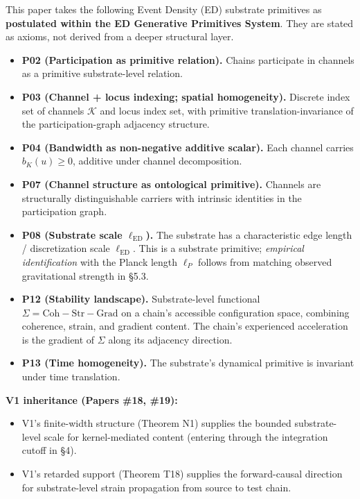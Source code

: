 \documentclass[11pt,a4paper]{article}
\begin{document}
This paper takes the following Event Density (ED) substrate primitives as \textbf{postulated within the ED Generative Primitives System}. They are stated as axioms, not derived from a deeper structural layer.

\begin{itemize}[noitemsep]
\item \textbf{P02 (Participation as primitive relation).} Chains participate in channels as a primitive substrate-level relation.
\item \textbf{P03 (Channel + locus indexing; spatial homogeneity).} Discrete index set of channels $\mathcal{K}$ and locus index set, with primitive translation-invariance of the participation-graph adjacency structure.
\item \textbf{P04 (Bandwidth as non-negative additive scalar).} Each channel carries $b_K(u) \geq 0$, additive under channel decomposition.
\item \textbf{P07 (Channel structure as ontological primitive).} Channels are structurally distinguishable carriers with intrinsic identities in the participation graph.
\item \textbf{P08 (Substrate scale $\ell_\mathrm{ED}$).} The substrate has a characteristic edge length / discretization scale $\ell_\mathrm{ED}$. This is a substrate primitive; \emph{empirical identification} with the Planck length $\ell_P$ follows from matching observed gravitational strength in \S5.3.
\item \textbf{P12 (Stability landscape).} Substrate-level functional $\Sigma = \mathrm{Coh} - \mathrm{Str} - \mathrm{Grad}$ on a chain's accessible configuration space, combining coherence, strain, and gradient content. The chain's experienced acceleration is the gradient of $\Sigma$ along its adjacency direction.
\item \textbf{P13 (Time homogeneity).} The substrate's dynamical primitive is invariant under time translation.
\end{itemize}

\textbf{V1 inheritance (Papers \#18, \#19):}

\begin{itemize}[noitemsep]
\item V1's finite-width structure (Theorem N1) supplies the bounded substrate-level scale for kernel-mediated content (entering through the integration cutoff in \S4).
\item V1's retarded support (Theorem T18) supplies the forward-causal direction for substrate-level strain propagation from source to test chain.
\end{itemize}
\end{document}
